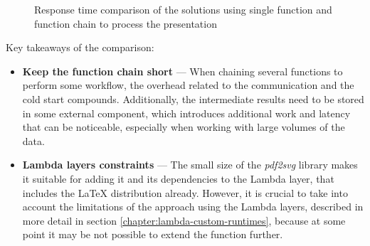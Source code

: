 \datasetChainVsSingle

\begin{figure}[H]
    \caption{Response time comparison of the solutions using single function and function chain to process the presentation}
    \label{chart:step-function-single-function-vs-function-chain}
\end{figure}

Key takeaways of the comparison:

\begin{itemize}
   \item \textbf{Keep the function chain short} --- When chaining several functions to perform some workflow, the overhead related to the communication and the cold start compounds. Additionally, the intermediate results need to be stored in some external component, which introduces additional work and latency that can be noticeable, especially when working with large volumes of the data.
   \item \textbf{Lambda layers constraints} --- The small size of the \textit{pdf2svg} library makes it suitable for adding it and its dependencies to the Lambda layer, that includes the LaTeX distribution already. However, it is crucial to take into account the limitations of the approach using the Lambda layers, described in more detail in section \ref{chapter:lambda-custom-runtimes}, because at some point it may be not possible to extend the function further.
\end{itemize}

